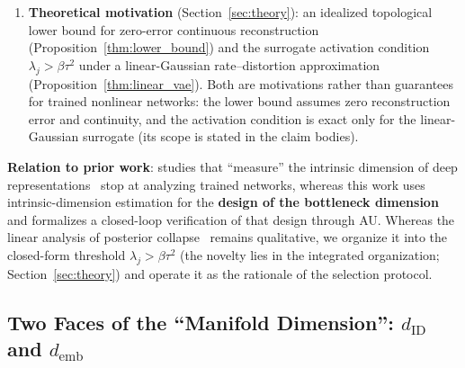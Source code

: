 \documentclass[make,article,submit,pdftex,moreauthors]{Definitions/mdpi}
\newcommand{\dID}{d_{\mathrm{ID}}}
\newcommand{\hatdID}{\hat{d}_{\mathrm{ID}}}
\newcommand{\demb}{d_{\mathrm{emb}}}
\newcommand{\dstar}{d^{*}(\beta)}
\begin{document}
\begin{enumerate}
        values~\cite{pope2021intrinsic} up to $m \approx 2\hatdID$ but
        inflates beyond;
        (c) for Conv-VAEs at $\beta_{\max} = 4$ the truncation threshold
        $\dstar$ exceeds 512, so AU verification requires a strengthened
        $\beta$ (the $\beta$-strengthened recovery achieves V1 only, not
        V2; 3 seeds), and Step 3 on natural images remains unresolved---the
        contributions are claimed inclusive of these limitations.
  \item \textbf{Theoretical motivation} (Section~\ref{sec:theory}):
        an idealized topological lower bound for zero-error continuous
        reconstruction (Proposition~\ref{thm:lower_bound}) and the
        surrogate activation condition $\lambda_j > \beta\tau^2$ under a
        linear-Gaussian rate--distortion approximation
        (Proposition~\ref{thm:linear_vae}).
        Both are motivations rather than guarantees for trained nonlinear
        networks: the lower bound assumes zero reconstruction error and
        continuity, and the activation condition is exact only for the
        linear-Gaussian surrogate (its scope is stated in the claim
        bodies).
\end{enumerate}

\textbf{Relation to prior work}:
studies that ``measure'' the intrinsic dimension of deep
representations~\cite{ansuini2019intrinsic,pope2021intrinsic,valeriani2023geometry}
stop at analyzing trained networks, whereas this work uses
intrinsic-dimension estimation for the \textbf{design of the bottleneck
dimension} and formalizes a closed-loop verification of that design through
AU.
Whereas the linear analysis of posterior collapse~\cite{lucas2019elbo}
remains qualitative, we organize it into the closed-form threshold
$\lambda_j > \beta\tau^2$ (the novelty lies in the integrated organization;
Section~\ref{sec:theory}) and operate it as the rationale of the selection
protocol.

\subsection{Two Faces of the ``Manifold Dimension'': $\dID$ and $\demb$}\label{sec:intro_dim}
\end{document}

